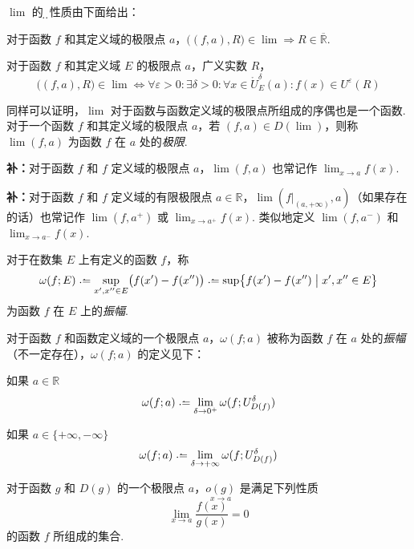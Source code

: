 \begin{definition}
    $\lim$ 的\d{部}\d{分}性质由下面给出：
    
    对于函数 $f$ 和其定义域的极限点 $a$，$\bigl((f,a),R\bigr) \in \lim \Rightarrow R \in \overline{\mathbb{R}}$.

    对于函数 $f$ 和其定义域 $E$ 的极限点 $a$，广义实数 $R$，
    \[\bigl((f,a),R\bigr) \in \lim \Leftrightarrow \forall \varepsilon > 0: \exists \delta > 0: \forall x \in \mathring{U}_E^\delta(a): f(x) \in U^\varepsilon(R)\]

    同样可以证明，$\lim$ 对于函数与函数定义域的极限点所组成的序偶也是一个函数. 对于一个函数 $f$ 和其定义域的极限点 $a$，若 $(f,a) \in D(\lim)$，则称 $\lim(f,a)$ 为函数 $f$ 在 $a$ 处的\emph{极限}.

    \textbf{补：}对于函数 $f$ 和 $f$ 定义域的极限点 $a$，$\lim(f,a)$ 也常记作 $\displaystyle \lim_{x \rightarrow a} f(x)$.

    \textbf{补：}对于函数 $f$ 和 $f$ 定义域的有限极限点 $a \in \mathbb{R}$，$\lim(f|_{(a,+\infty)},a)$（如果存在的话）也常记作 $\lim(f,a^+)$ 或 $\displaystyle \lim_{x \rightarrow a^+} f(x)$. 类似地定义 $\lim(f,a^-)$ 和 $\displaystyle \lim_{x \rightarrow a^-} f(x)$.
\end{definition}\vspace{9pt}

\begin{definition}
    对于在数集 $E$ 上有定义的函数 $f$，称
    \[\omega(f;E) \defeq \sup_{x',x'' \in E} \bigl(f(x') - f(x'')\bigr) \defeq \sup \bigl\{f(x') - f(x'') \bigm| x',x'' \in E\bigr\}\]
    为函数 $f$ 在 $E$ 上的\emph{振幅}.
\end{definition}\vspace{9pt}

\begin{definition}
    对于函数 $f$ 和函数定义域的一个极限点 $a$，$\omega(f;a)$ 被称为函数 $f$ 在 $a$ 处的\emph{振幅}（不一定存在），$\omega(f;a)$ 的定义见下：

    如果 $a \in \mathbb{R}$
    \[\omega(f;a) \defeq \lim_{\delta \rightarrow 0^+} \omega(f;U_{D(f)}^\delta)\]
    
    如果 $a \in \{+\infty, -\infty\}$
    \[\omega(f;a) \defeq \lim_{\delta \rightarrow +\infty} \omega(f;U_{D(f)}^\delta)\]
\end{definition}\vspace{9pt}

\begin{subdefinition}
    对于函数 $g$ 和 $D(g)$ 的一个极限点 $a$，$\underset{x \rightarrow a}{o(g)}$ 是满足下列性质
    \[\lim_{x \rightarrow a} \frac{f(x)}{g(x)} = 0\]
    的函数 $f$ 所组成的集合. 
\end{subdefinition}

